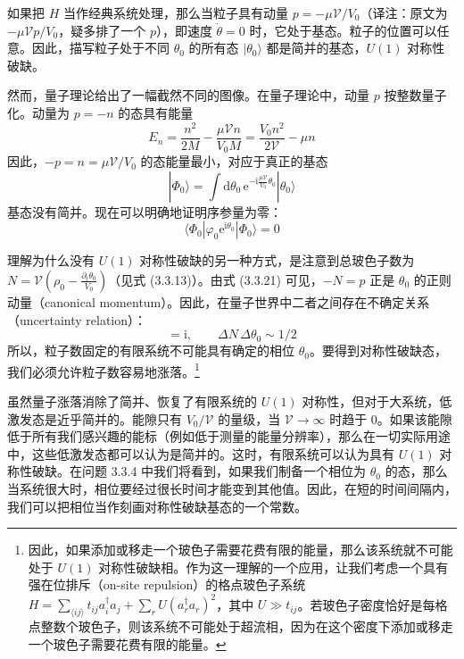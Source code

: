 如果把 $H$ 当作经典系统处理，那么当粒子具有动量 $p=-\mu\mathcal{V}/V_0$（译注：原文为 $-\mu\mathcal{V}p/V_0$，疑多排了一个 $p$），即速度 $\dot{\theta}=0$ 时，它处于基态。粒子的位置可以任意。因此，描写粒子处于不同 $\theta_0$ 的所有态 $|\theta_0\rangle$ 都是简并的基态，$U(1)$ 对称性破缺。

然而，量子理论给出了一幅截然不同的图像。在量子理论中，动量 $p$ 按整数量子化。动量为 $p=-n$ 的态具有能量
\begin{equation*}
E_n=\frac{n^2}{2M}-\frac{\mu\mathcal{V}n}{V_0M}=\frac{V_0n^2}{2\mathcal{V}}-\mu n \tag{3.3.22}
\end{equation*}
因此，$-p=n=\mu\mathcal{V}/V_0$ 的态能量最小，对应于真正的基态
\begin{equation*}
|\Phi_0\rangle=\int\mathrm{d}\theta_0\,\mathrm{e}^{-\mathrm{i}\frac{\mu\mathcal{V}}{V_0}\theta_0}|\theta_0\rangle
\end{equation*}
基态没有简并。现在可以明确地证明序参量为零：
\begin{equation*}
\langle\Phi_0|\varphi_0\mathrm{e}^{\mathrm{i}\theta_0}|\Phi_0\rangle=0
\end{equation*}

理解为什么没有 $U(1)$ 对称性破缺的另一种方式，是注意到总玻色子数为 $N=\mathcal{V}(\rho_0-\frac{\partial_t\theta_0}{V_0})$（见式 (3.3.13)）。由式 (3.3.21) 可见，$-N=p$ 正是 $\theta_0$ 的正则动量（canonical momentum）。因此，在量子世界中二者之间存在不确定关系（uncertainty relation）：
\begin{equation*}
[\hat{N},\theta_0]=\mathrm{i},\qquad \Delta N\,\Delta\theta_0\sim 1/2
\end{equation*}
所以，粒子数固定的有限系统不可能具有确定的相位 $\theta_0$。要得到对称性破缺态，我们必须允许粒子数容易地涨落。\footnote{因此，如果添加或移走一个玻色子需要花费有限的能量，那么该系统就不可能处于 $U(1)$ 对称性破缺相。作为这一理解的一个应用，让我们考虑一个具有强在位排斥（on-site repulsion）的格点玻色子系统 $H=\sum_{\langle ij\rangle}t_{ij}a_i^{\dagger}a_j+\sum_r U(a_r^{\dagger}a_r)^2$，其中 $U\gg t_{ij}$。若玻色子密度恰好是每格点整数个玻色子，则该系统不可能处于超流相，因为在这个密度下添加或移走一个玻色子需要花费有限的能量。}

虽然量子涨落消除了简并、恢复了有限系统的 $U(1)$ 对称性，但对于大系统，低激发态是近乎简并的。能隙只有 $V_0/\mathcal{V}$ 的量级，当 $\mathcal{V}\to\infty$ 时趋于 0。如果该能隙低于所有我们感兴趣的能标（例如低于测量的能量分辨率），那么在一切实际用途中，这些低激发态都可以认为是简并的。这时，有限系统可以认为具有 $U(1)$ 对称性破缺。在问题 3.3.4 中我们将看到，如果我们制备一个相位为 $\theta_0$ 的态，那么当系统很大时，相位要经过很长时间才能变到其他值。因此，在短的时间间隔内，我们可以把相位当作刻画对称性破缺基态的一个常数。

